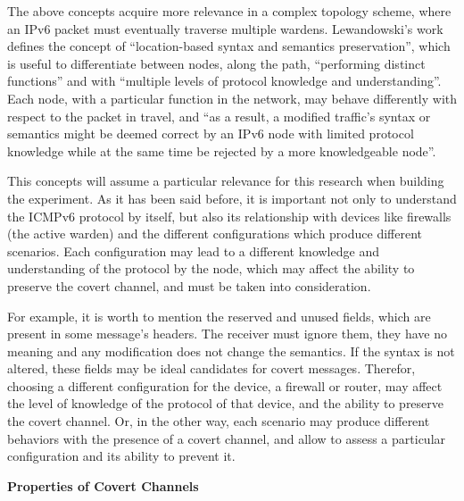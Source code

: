 \documentclass[12pt]{article}
\begin{document}
The above concepts acquire more relevance in a complex topology scheme, where an IPv6 packet must eventually traverse multiple wardens. Lewandowski's work defines the concept of ``location-based syntax and semantics preservation'', which is useful to differentiate between nodes, along the path, ``performing distinct functions'' and with ``multiple levels of protocol knowledge and understanding''. Each node, with a particular function in the network, may behave differently with respect to the packet in travel, and ``as a result, a modified traffic’s syntax or semantics might be deemed correct by an IPv6 node with limited protocol knowledge while at  the same time be rejected by a more knowledgeable node''\cite{lewandowski}.

This concepts will assume a particular relevance for this research when building the experiment. As it has been said before, it is important not only to understand the ICMPv6 protocol by itself, but also its relationship with devices like firewalls (the active warden) and the different configurations which produce different scenarios. Each configuration may lead to a different knowledge and understanding of the protocol by the node, which may affect the ability to preserve the covert channel, and must be taken into consideration. 

For example, it is worth to mention the reserved and unused fields, which are present in some message's headers. The receiver must ignore them, they have no meaning and any modification does not change the semantics. If the syntax is not altered, these fields may be ideal candidates for covert messages\cite{lewandowski}. Therefor, choosing a different configuration for the device, a firewall or router, may affect the level of knowledge of the protocol of that device, and the ability to preserve the covert channel. Or, in the other way, each scenario may produce different behaviors with the presence of a covert channel, and allow to assess a particular configuration and its ability to prevent it.

\textbf{Properties of Covert Channels}
\end{document}
